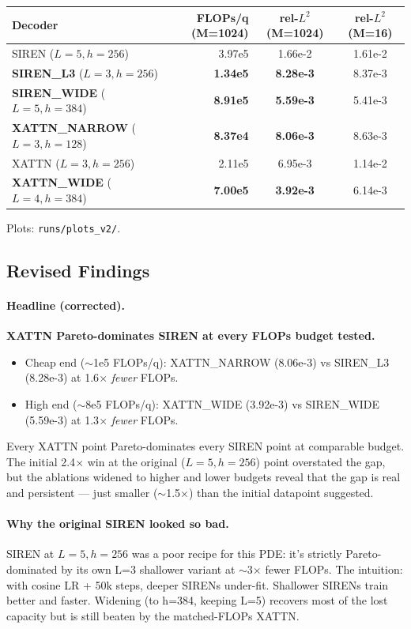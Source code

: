 \documentclass[11pt]{article}
\begin{document}
\begin{center}
\begin{tabular}{lrcc}
\toprule
Decoder & FLOPs/q (M=1024) & rel-$L^2$ (M=1024) & rel-$L^2$ (M=16) \\
\midrule
SIREN ($L{=}5, h{=}256$)        & 3.97e5 & 1.66e-2 & 1.61e-2 \\
\textbf{SIREN\_L3} ($L{=}3, h{=}256$)    & \textbf{1.34e5} & \textbf{8.28e-3} & 8.37e-3 \\
\textbf{SIREN\_WIDE} ($L{=}5, h{=}384$)  & \textbf{8.91e5} & \textbf{5.59e-3} & 5.41e-3 \\
\textbf{XATTN\_NARROW} ($L{=}3, h{=}128$)& \textbf{8.37e4} & \textbf{8.06e-3} & 8.63e-3 \\
XATTN ($L{=}3, h{=}256$)         & 2.11e5 & 6.95e-3 & 1.14e-2 \\
\textbf{XATTN\_WIDE} ($L{=}4, h{=}384$)  & \textbf{7.00e5} & \textbf{3.92e-3} & 6.14e-3 \\
\bottomrule
\end{tabular}
\end{center}

Plots: \texttt{runs/plots\_v2/}.

\subsection*{Revised Findings}

\paragraph{Headline (corrected).}
\textbf{XATTN Pareto-dominates SIREN at every FLOPs budget tested.}
\begin{itemize}
\item Cheap end ($\sim$1e5 FLOPs/q): XATTN\_NARROW (8.06e-3) vs SIREN\_L3
      (8.28e-3) at 1.6$\times$ \emph{fewer} FLOPs.
\item High end ($\sim$8e5 FLOPs/q): XATTN\_WIDE (3.92e-3) vs SIREN\_WIDE
      (5.59e-3) at 1.3$\times$ \emph{fewer} FLOPs.
\end{itemize}
Every XATTN point Pareto-dominates every SIREN point at comparable
budget. The initial 2.4$\times$ win at the original ($L{=}5, h{=}256$)
point overstated the gap, but the ablations widened to higher and lower
budgets reveal that the gap is real and persistent --- just smaller
($\sim$1.5$\times$) than the initial datapoint suggested.

\paragraph{Why the original SIREN looked so bad.}
SIREN at $L{=}5, h{=}256$ was a poor recipe for this PDE: it's
strictly Pareto-dominated by its own L=3 shallower variant at $\sim$3$\times$
fewer FLOPs. The intuition: with cosine LR + 50k steps, deeper SIRENs
under-fit. Shallower SIRENs train better and faster. Widening (to h=384,
keeping L=5) recovers most of the lost capacity but is still beaten by
the matched-FLOPs XATTN.
\end{document}
